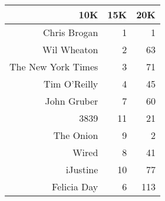 %
%
%
\begin{tabular}{|r|r|r|}
\hline
10K & 15K & 20K\\
\hline
Chris Brogan & 1 & 1 \\
Wil Wheaton & 2 & 63 \\
The New York Times & 3 & 71 \\
Tim O'Reilly & 4 & 45 \\
John Gruber & 7 & 60 \\
3839 & 11 & 21 \\
The Onion & 9 & 2 \\
Wired & 8 & 41 \\
iJustine & 10 & 77 \\
Felicia Day & 6 & 113 \\
\hline
\end{tabular}
